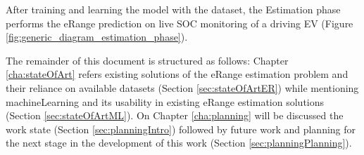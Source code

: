 After training and learning the model with the \gls{dataset},
the Estimation phase performs the \gls{eRange} prediction
on live \gls{SOC} monitoring of a driving \gls{EV}
(Figure \ref{fig:generic_diagram_estimation_phase}).

The remainder of this document is structured as follows: 
Chapter \ref{cha:stateOfArt} refers existing solutions 
of the \gls{eRange} estimation problem and their reliance on available
\glspl{dataset} (Section \ref{sec:stateOfArtER}) while
mentioning \gls{machineLearning} and its usability 
in existing \gls{eRange} estimation solutions 
(Section \ref{sec:stateOfArtML}).
On Chapter \ref{cha:planning} will be discussed the 
work state (Section \ref{sec:planningIntro}) followed by 
future work and planning for the next stage 
in the development of this work 
(Section \ref{sec:planningPlanning}). 